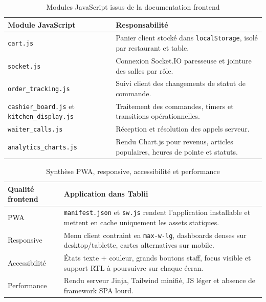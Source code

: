 \documentclass[12pt,a4paper]{report}
\begin{document}
\begin{table}[H]
    \centering
    \begin{tabularx}{\textwidth}{>{\RaggedRight\arraybackslash}p{4.2cm} X}
        \toprule
        \rowcolor{secondary!10}
        \textbf{Module JavaScript} & \textbf{Responsabilité} \\
        \midrule
        \texttt{cart.js} & Panier client stocké dans \texttt{localStorage}, isolé par restaurant et table. \\
        \texttt{socket.js} & Connexion Socket.IO paresseuse et jointure des salles par rôle. \\
        \texttt{order\_tracking.js} & Suivi client des changements de statut de commande. \\
        \texttt{cashier\_board.js} et \texttt{kitchen\_display.js} & Traitement des commandes, timers et transitions opérationnelles. \\
        \texttt{waiter\_calls.js} & Réception et résolution des appels serveur. \\
        \texttt{analytics\_charts.js} & Rendu Chart.js pour revenus, articles populaires, heures de pointe et statuts. \\
        \bottomrule
    \end{tabularx}
    \caption{Modules JavaScript issus de la documentation frontend}
    \label{tab:frontend-js}
\end{table}

\begin{table}[H]
    \centering
    \begin{tabularx}{\textwidth}{l X}
        \toprule
        \rowcolor{accent!10}
        \textbf{Qualité frontend} & \textbf{Application dans Tablii} \\
        \midrule
        PWA & \texttt{manifest.json} et \texttt{sw.js} rendent l'application installable et mettent en cache uniquement les assets statiques. \\
        Responsive & Menu client contraint en \texttt{max-w-lg}, dashboards denses sur desktop/tablette, cartes alternatives sur mobile. \\
        Accessibilité & États texte + couleur, grands boutons staff, focus visible et support RTL à poursuivre sur chaque écran. \\
        Performance & Rendu serveur Jinja, Tailwind minifié, JS léger et absence de framework SPA lourd. \\
        \bottomrule
    \end{tabularx}
    \caption{Synthèse PWA, responsive, accessibilité et performance}
    \label{tab:frontend-quality}
\end{table}
\end{document}
